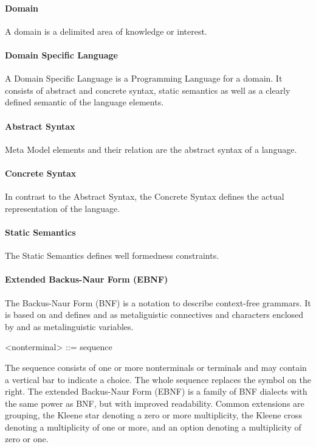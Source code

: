 \paragraph{Domain} A domain is a delimited area of knowledge or interest. \cite{MDSD}

\paragraph{Domain Specific Language} A Domain Specific Language is a Programming Language for a domain. It consists of abstract and concrete syntax, static semantics as well as a clearly defined semantic of the language elements. \cite{MDSD}

\paragraph{Abstract Syntax} Meta Model elements and their relation are the abstract syntax of a language. \cite{MDSD}

\paragraph{Concrete Syntax} In contrast to the Abstract Syntax, the Concrete Syntax defines the actual representation of the language. \cite{MDSD}

\paragraph{Static Semantics} The Static Semantics defines well formedness constraints. \cite{MDSD}
 
\paragraph{Extended Backus-Naur Form (EBNF)} 
The Backus-Naur Form (BNF) is a notation to describe context-free grammars. It is based on \cite{BNF} and defines \code{:=} and \code{|} as metaliguistic connectives and characters enclosed by \code{<} and \code{>} as metalinguistic variables.
\begin{xtxt}
 <nonterminal> ::= sequence
\end{xtxt}
The sequence consists of one or more nonterminals or terminals and may contain a vertical bar to indicate a choice. The whole sequence replaces the symbol on the right. The extended Backus-Naur Form (EBNF) is a family of BNF dialects with the same power as BNF, but with improved readability. Common extensions are grouping, the Kleene star denoting a zero or more multiplicity, the Kleene cross denoting a multiplicity of one or more, and an option denoting a multiplicity of zero or one. \cite{ParserBook}

